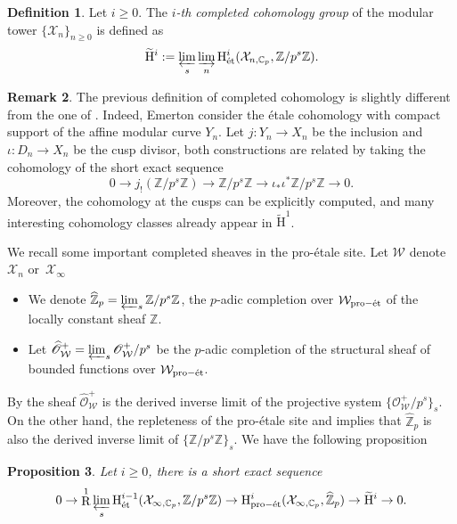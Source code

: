\documentclass[11pt]{article}
\newcommand{\et}{\mathrm{\acute{e}t}}
\newcommand{\proet}{\mathrm{pro}\textup{-}\et}
\numberwithin{equation}{section}
\newtheorem{prop}{Proposition}[section]
\theoremstyle{definition}
\newtheorem{definition}[prop]{Definition}
\newtheorem{remark}[prop]{Remark}
\newcommand{\bb}[1]{\mathbb{#1}}
\newcommand{\n}[1]{\mathcal{#1}}
\newcommand{\s}[1]{\mathscr{#1}}
\DeclareMathOperator{\R}{R}
\begin{document}
\begin{definition}
Let $i\geq 0$. The \textit{$i$-th completed cohomology group} of the modular tower $\{\n{X}_n\}_{n\geq 0}$ is defined as\vspace*{-3pt}
\[
\widetilde{\mathrm{H}}^i:= \varprojlim_{s} \varinjlim_{n} \mathrm{H}_{\et}^i(\n{X}_{n,\bb{C}_p}, \bb{Z}/p^s \bb{Z}).
\]
\end{definition}
\begin{remark}
The previous definition of completed cohomology is slightly different from the one of \cite{MR2207783}. Indeed, Emerton consider the étale cohomology with compact support of the affine modular curve $Y_n$. Let $j: Y_n\to X_n$ be the inclusion and $\iota: D_n\to X_n$ be the cusp divisor, both constructions are related by taking the cohomology of the short exact sequence\vspace*{-3pt}
\[
0 \to j_!(\bb{Z}/p^s \bb{Z}) \to \bb{Z}/p^s \bb{Z} \to \iota_* \iota^* \bb{Z}/p^s \bb{Z}\to 0.
\]
Moreover, the cohomology at the cusps can be explicitly computed, and many interesting cohomology classes already appear in $\widetilde{\mathrm{H}}^1$.
\end{remark}

We recall some important completed sheaves in the pro-étale site. Let $\n{W}$ denote~$\n{X}_n$ or~$\n{X}_{\infty}$
\begin{itemize}
\item
We denote $\widehat{\bb{Z}}_p = \varprojlim_s \bb{Z}/p^s\bb{Z}$, the $p$-adic completion over $\n{W}_{\proet}$ of the locally constant sheaf $\bb{Z}$.

\item
Let $\widehat{\s{O}}^+_{\n{W}}= \varprojlim_{s} \s{O}_{\n{W}}^+/p^s$ be the $p$-adic completion of the structural sheaf of bounded functions over $\n{W}_{\proet}$.
\end{itemize}
By \cite[Lem.\,3.18]{MR3090230} the sheaf $\widehat{\s{O}}_{\n{W}}^+$ is the derived inverse limit of the projective system $\{\s{O}_{\n{W}}^+/p^s\}_s$. On the other hand, the repleteness of the pro-étale site and \cite[Prop.\,3.1.10]{bhatt2014proetale} implies that $\widehat{\bb{Z}}_p$ is also the derived inverse limit of $\{\bb{Z}/p^s\bb{Z}\}_{s}$. We have the following proposition

\begin{prop}
\label{PropCompletedCohAndPerf}
Let $i\geq 0$, there is a short exact sequence
\[
0\to \R^1 \varprojlim_s \mathrm{H}^{i-1}_{\et}(\n{X}_{\infty, \bb{C}_p}, \bb{Z}/p^s \bb{Z}) \to \mathrm{H}^i_{\proet}(\n{X}_{\infty, \bb{C}_p}, \widehat{\bb{Z}}_p) \to \widetilde{\mathrm{H}}^i\to 0.
\]
\end{prop}
\end{document}
